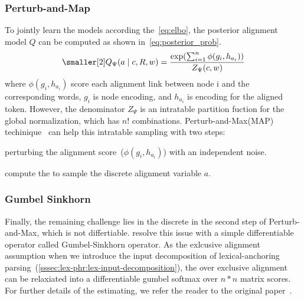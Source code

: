 \subsubsection{Perturb-and-Map}
\label{sssec:lex-phr:perturb-and-map}
To jointly learn the models according the~\autoref{eq:elbo}, the
posterior alignment model $Q$ can be computed as shown
in~\autoref{eq:posterior_prob}.
\begin{equation}
  \label{eq:posterior_prob}
\begin{aligned} \smaller[2]
Q_{\Psi}(a\mid c, R,w)= \frac{\exp(\sum_{i=1}^{n} \phi(g_{i}, h_{a_{i}}))} {Z_{\Psi}(c,w)}
\end{aligned}
\end{equation}
where $\phi(g_{i}, h_{a_{i}})$ score each alignment link between node i
and the corresponding words, $g_{i}$ is node encoding, and $h_{a_{i}}$
is encoding for the aligned token. However, the denominator $Z_{\Psi}$ is
an intratable partition fuction for the global normalization, which
has $n!$ combinations. Perturb-and-Max(MAP)
techinique~\cite{papandreouperturb} can help this intratable sampling
with two steps:
\begin{inparaenum}[(1)]
\item perturbing the alignment score~($\phi(g_{i}, h_{a_{i}})$) with an
  independent noise.
\item compute the  to sample the discrete alignment
  variable $a$.
\end{inparaenum}

\subsubsection{Gumbel Sinkhorn}
\label{sssec:lex-phr:gumbel-sinkhorn}
Finally, the remaining challenge lies in the discrete  in
the second step of Perturb-and-Max, which is not differtiable.
\citet{mena2018learning} resolve this issue with a simple
differentiable operator called Gumbel-Sinkhorn operator. As the
exlcusive alignment assumption when we introduce the input
decomposition of lexical-anchoring
parsing~(\autoref{sssec:lex-phr:lex-input-decomposition}), the
 over exclusive alignment can be relaxiated into a
differentiable gumbel softmax over $n*n$ matrix scores. For further
details of the estimating, we refer the reader to the original
paper~\citep{mena2018learning,lyu2018amr}.

